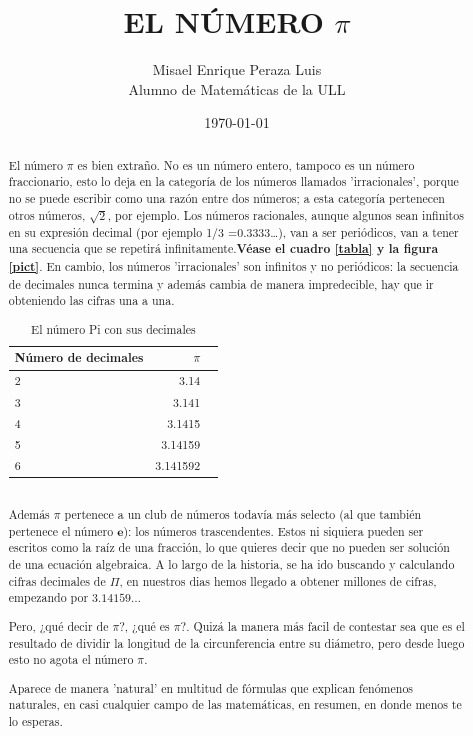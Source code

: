 \documentclass[spanish,a4paper,11pt]{article}
\title{\bf {EL NÚMERO $\pi$}}
\author{Misael Enrique Peraza Luis\\Alumno de Matemáticas de la ULL}
\date{\today}
\begin{document}
\maketitle

\begin{abstract}
El número $\pi$ es bien extraño. No es un número entero, tampoco es un número fraccionario, esto lo deja en la categoría de los números llamados 'irracionales', porque no se puede escribir como una razón entre dos números; a esta categoría pertenecen otros números, $\sqrt{2}$, por ejemplo.
Los números racionales, aunque algunos sean infinitos en su expresión decimal (por ejemplo 1/3 =0.3333…), van a ser periódicos, van a tener una secuencia que se repetirá infinitamente.\textbf{Véase el cuadro \ref{tabla} y la figura \ref{pict}}.
En cambio, los números 'irracionales' son infinitos y no periódicos: la secuencia de decimales nunca termina y además cambia de manera impredecible, hay que ir obteniendo las cifras una a una. \cite{Wpress}
\begin{table}
\centering
\begin{tabular}{lrc}
Número de decimales & $\pi$ \\
\hline
2 & 3.14\\
3 & 3.141\\
4 & 3.1415\\
5 & 3.14159\\
6 & 3.141592\\
\end{tabular}
\caption{El número Pi con sus decimales}
\label{tabla}
\end{table}

\ \\
Además $\pi$ pertenece a un club de números todavía más selecto (al que también pertenece el número $\textbf{e}$): los números trascendentes. Estos ni siquiera pueden ser escritos como la raíz de una fracción, lo que quieres decir que no pueden ser solución de una ecuación algebraica.
A lo largo de la historia, se ha ido buscando y calculando cifras decimales de $\Pi$, en nuestros dias hemos llegado a obtener millones de cifras, empezando por $3.14159…$

Pero, ¿qué decir de $\pi$?, ¿qué es $\pi$?. Quizá la manera más facil de contestar sea que es el resultado de dividir la longitud de la circunferencia entre su diámetro, pero desde luego esto no agota el número $\pi$.

Aparece de manera 'natural' en multitud de fórmulas que explican fenómenos naturales, en casi cualquier campo de las matemáticas, en resumen, en donde menos te lo esperas.


\end{abstract}
\end{document}
